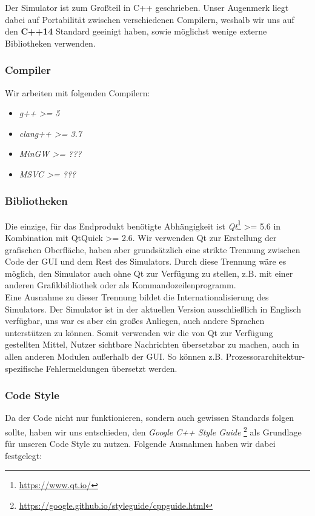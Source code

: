 Der Simulator ist zum Großteil in C++ geschrieben. Unser Augenmerk liegt dabei auf Portabilität
zwischen verschiedenen Compilern, weshalb wir uns auf den \textbf{C++14} Standard geeinigt haben,
sowie möglichst wenige externe Bibliotheken verwenden.

\subsubsection{Compiler}

Wir arbeiten mit folgenden Compilern:

\begin{itemize}
	\item \textit{g++ >= 5}
	\item \textit{clang++ >= 3.7}
	\item \textit{MinGW >= ???}
	\item \textit{MSVC >= ???}
\end{itemize}

\subsubsection{Bibliotheken}

Die einzige, für das Endprodukt benötigte Abhängigkeit ist \textit{Qt}\footnote{\url{https://www.qt.io/}}
>= 5.6 in Kombination mit QtQuick >= 2.6. Wir verwenden Qt zur Erstellung der grafischen Oberfläche,
haben aber grundsätzlich eine strikte Trennung zwischen Code der GUI und dem Rest des Simulators.
Durch diese Trennung wäre es möglich, den Simulator auch ohne Qt zur Verfügung zu stellen, z.B.
mit einer anderen Grafikbibliothek oder als Kommandozeilenprogramm. \\
Eine Ausnahme zu dieser Trennung bildet die Internationalisierung des Simulators. Der Simulator ist
in der aktuellen Version ausschließlich in Englisch verfügbar, uns war es aber ein großes Anliegen,
auch andere Sprachen unterstützen zu können. Somit verwenden wir die von Qt zur Verfügung gestellten
Mittel, Nutzer sichtbare Nachrichten übersetzbar zu machen, auch in allen anderen Modulen außerhalb
der GUI. So können z.B. Prozessorarchitektur-spezifische Fehlermeldungen übersetzt werden.

\subsubsection{Code Style}

Da der Code nicht nur funktionieren, sondern auch gewissen Standards folgen
sollte, haben wir uns entschieden, den \textit{Google C++ Style Guide}
\footnote{\url{https://google.github.io/styleguide/cppguide.html}} als Grundlage
für unseren Code Style zu nutzen. Folgende Ausnahmen haben wir dabei festgelegt:

